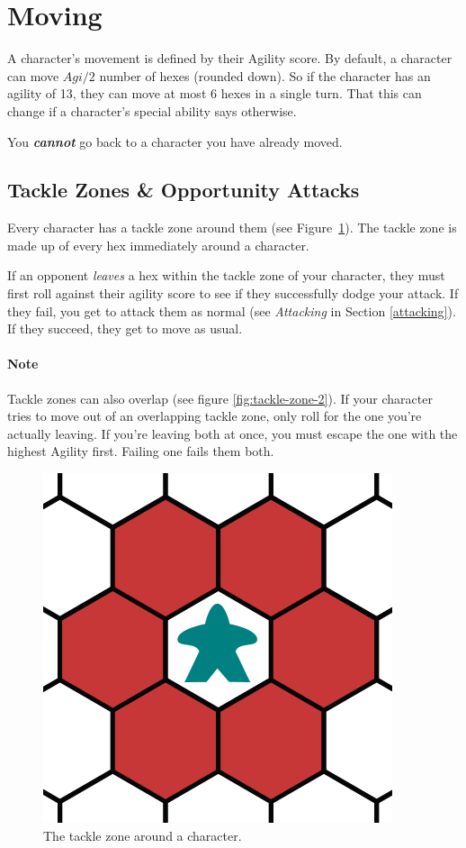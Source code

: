 \section{Moving} \label{moving}
A character's movement is defined by their Agility score.
By default, a character can move $Agi / 2$ number of hexes (rounded down).
So if the character has an agility of 13, they can move at most 6 hexes in a single turn.
That this can change if a character's special ability says otherwise.

\begin{note}
    You \textit{\textbf{cannot}} go back to a character you have already moved.
\end{note}

\subsection{Tackle Zones \& Opportunity Attacks}
Every character has a tackle zone around them (see Figure~\ref{fig:tackle-zone-1}).
The tackle zone is made up of every hex immediately around a character.

If an opponent \textit{leaves} a hex within the tackle zone of your character, they must first roll against their agility score to see if they successfully dodge your attack.
If they fail, you get to attack them as normal (see \textit{Attacking} in Section \ref{attacking}).
If they succeed, they get to move as usual.

\paragraph{Note} Tackle zones can also overlap (see figure \ref{fig:tackle-zone-2}).
If your character tries to move out of an overlapping tackle zone, only roll for the one you're actually leaving.
If you're leaving both at once, you must escape the one with the highest Agility first.
Failing one fails them both.

\begin{figure}
    \centering
    \includegraphics{graphics/tackle-zones-1.png}
    \caption{The tackle zone around a character.}
    \label{fig:tackle-zone-1}
\end{figure}

